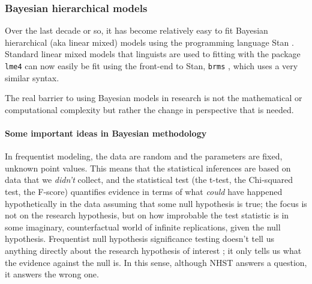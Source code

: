 \documentclass{ar-1col}\usepackage[]{graphicx}\usepackage[]{color}
\begin{document}
\subsubsection{Bayesian hierarchical models}

Over the last decade or so, it has become relatively easy to fit Bayesian hierarchical (aka linear mixed) models using the programming language Stan \citep{rstan2141,carpenter2017stan}. Standard linear mixed models that linguists are used to fitting with the package \texttt{lme4} can now easily be fit using the front-end to Stan, \texttt{brms} \citep{brms}, which uses a very similar syntax.

The real barrier to using Bayesian models in research is not the mathematical or computational complexity but rather the change in perspective that is needed.

\paragraph{Some important ideas in Bayesian methodology}
In frequentist modeling, the data are random and the parameters are fixed, unknown point values. This means that the statistical inferences are based on data that we \textit{didn't} collect, and the statistical test (the t-test, the Chi-squared test, the F-score) quantifies evidence in terms of what \textit{could} have happened  hypothetically in the data assuming that some null hypothesis is true; the focus is not on the research hypothesis, but on how improbable the test statistic is in some imaginary, counterfactual world of infinite replications, given the null hypothesis. Frequentist null hypothesis significance testing doesn't tell us anything directly about the research hypothesis of interest \citep{pvals}; it only tells us what the evidence against the null is. In this sense, although NHST answers a question, it answers the wrong one.
\end{document}
